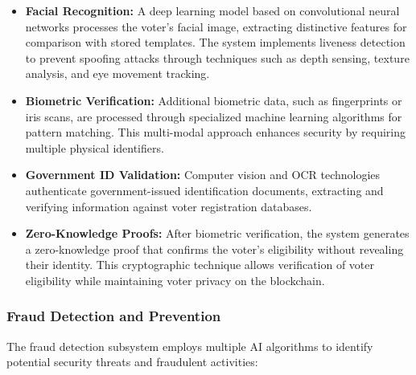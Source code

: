 \documentclass[conference]{IEEEtran}
\begin{document}
\begin{itemize}
    \item \textbf{Facial Recognition:} A deep learning model based on convolutional neural networks processes the voter's facial image, extracting distinctive features for comparison with stored templates. The system implements liveness detection to prevent spoofing attacks through techniques such as depth sensing, texture analysis, and eye movement tracking.
    
    \item \textbf{Biometric Verification:} Additional biometric data, such as fingerprints or iris scans, are processed through specialized machine learning algorithms for pattern matching. This multi-modal approach enhances security by requiring multiple physical identifiers.
    
    \item \textbf{Government ID Validation:} Computer vision and OCR technologies authenticate government-issued identification documents, extracting and verifying information against voter registration databases.
    
    \item \textbf{Zero-Knowledge Proofs:} After biometric verification, the system generates a zero-knowledge proof that confirms the voter's eligibility without revealing their identity. This cryptographic technique allows verification of voter eligibility while maintaining voter privacy on the blockchain.
\end{itemize}

\subsubsection{Fraud Detection and Prevention}
The fraud detection subsystem employs multiple AI algorithms to identify potential security threats and fraudulent activities:
\end{document}
